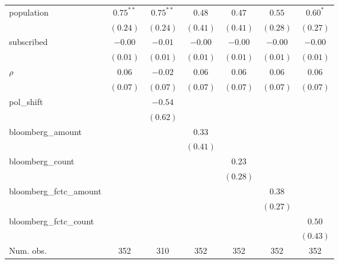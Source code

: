 \begin{table}[!h]
\begin{center}
\begin{tabular}{l c c c c c c }
population              & $0.75^{**}$  & $0.75^{**}$  & $0.48$       & $0.47$       & $0.55$       & $0.60^{*}$   \\
                        & $(0.24)$     & $(0.24)$     & $(0.41)$     & $(0.41)$     & $(0.28)$     & $(0.27)$     \\
subscribed              & $-0.00$      & $-0.01$      & $-0.00$      & $-0.00$      & $-0.00$      & $-0.00$      \\
                        & $(0.01)$     & $(0.01)$     & $(0.01)$     & $(0.01)$     & $(0.01)$     & $(0.01)$     \\
$\rho$                  & $0.06$       & $-0.02$      & $0.06$       & $0.06$       & $0.06$       & $0.06$       \\
                        & $(0.07)$     & $(0.07)$     & $(0.07)$     & $(0.07)$     & $(0.07)$     & $(0.07)$     \\
pol\_shift              &              & $-0.54$      &              &              &              &              \\
                        &              & $(0.62)$     &              &              &              &              \\
bloomberg\_amount       &              &              & $0.33$       &              &              &              \\
                        &              &              & $(0.41)$     &              &              &              \\
bloomberg\_count        &              &              &              & $0.23$       &              &              \\
                        &              &              &              & $(0.28)$     &              &              \\
bloomberg\_fctc\_amount &              &              &              &              & $0.38$       &              \\
                        &              &              &              &              & $(0.27)$     &              \\
bloomberg\_fctc\_count  &              &              &              &              &              & $0.50$       \\
                        &              &              &              &              &              & $(0.43)$     \\
\midrule
Num. obs.               & 352          & 310          & 352          & 352          & 352          & 352          \\

\end{tabular}
\end{center}
\end{table}

